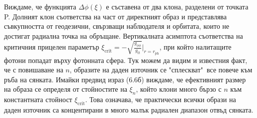 \begin{minipage}{20em}
	Виждаме, че функцията $\Delta\phi(\xi)$ е съставена от два клона, разделени от точката P. Долният клон съответства на част от директният образ и представлява съвкупността от геодезични, свързващи наблюдателя и орбитата, които не достигат радиална точка на обръщане. Вертикалната асимптота съответства на критичния прицелен параметър $\xi_\text{crit} = -\sqrt{\frac{g_{\phi\phi}}{g_{tt}}}\big\vert_{r = r_\text{ph}}$, при който налитащите фотони попадат върху фотонната сфера. Тук можем да видим и известния факт, че с повишаване на $n$, образите на даден източник се "сплескват"$\,$ все повече към ръба на сянката. Имайки предвид израз (6.6б) виждаме, че ефективният размер на образа се определя от стойностите на $\xi_n$, който клони много бързо с $n$ към константната стойност $\xi_\text{crit}$. Това означава, че практически всички образи на даден източник са концентирани в много малък радиален диапазон отвъд сянката.
\end{minipage}\\

